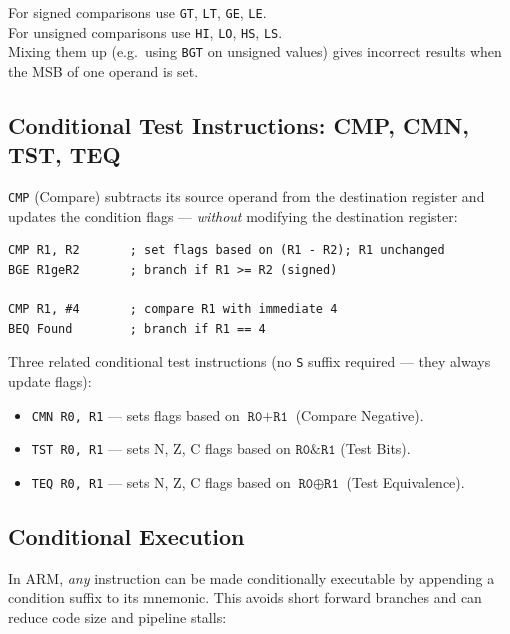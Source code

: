 \documentclass[11pt, a4paper, notitlepage]{report}
\theoremstyle{definition}
\theoremstyle{remark}
\theoremstyle{definition}
\begin{document}
\begin{examtip}[title={Signed vs.\ Unsigned Branches}]
For signed comparisons use \texttt{GT}, \texttt{LT}, \texttt{GE}, \texttt{LE}.\\
For unsigned comparisons use \texttt{HI}, \texttt{LO}, \texttt{HS}, \texttt{LS}.\\
Mixing them up (e.g.\ using \texttt{BGT} on unsigned values) gives incorrect results when the MSB of one operand is set.
\end{examtip}

\subsection{Conditional Test Instructions: CMP, CMN, TST, TEQ}

\texttt{CMP} (Compare) subtracts its source operand from the destination register and updates the condition flags --- \emph{without} modifying the destination register:

\begin{lstlisting}
CMP R1, R2       ; set flags based on (R1 - R2); R1 unchanged
BGE R1geR2       ; branch if R1 >= R2 (signed)

CMP R1, #4       ; compare R1 with immediate 4
BEQ Found        ; branch if R1 == 4
\end{lstlisting}

Three related conditional test instructions (no \texttt{S} suffix required --- they always update flags):

\begin{itemize}
  \item \texttt{CMN R0, R1} --- sets flags based on $\texttt{R0} + \texttt{R1}$ (Compare Negative).
  \item \texttt{TST R0, R1} --- sets N, Z, C flags based on $\texttt{R0} \mathbin{\&} \texttt{R1}$ (Test Bits).
  \item \texttt{TEQ R0, R1} --- sets N, Z, C flags based on $\texttt{R0} \oplus \texttt{R1}$ (Test Equivalence).
\end{itemize}

\subsection{Conditional Execution}

In ARM, \emph{any} instruction can be made conditionally executable by appending a condition suffix to its mnemonic. This avoids short forward branches and can reduce code size and pipeline stalls:
\end{document}

